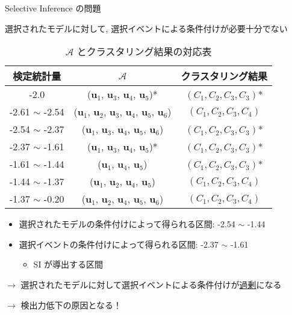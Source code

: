 \documentclass[dvipdfmx, 10pt]{beamer}
\newcommand{\ul}{\underline}
\newcommand{\zl}{\rightarrow}
\begin{document}
\begin{frame}{Selective Inference の問題}

    選択されたモデルに対して, 選択イベントによる条件付けが必要十分でない
    \begin{table}[htb]
        \centering
        \begin{tabular}{|c|c|c|} \hline
            検定統計量 & $\mathcal{A}$ & クラスタリング結果 \\\hline
            -2.0 & ($\bm{u}_1$, $\bm{u}_3$, $\bm{u}_4$, $\bm{u}_5$)* & $(C_1, C_2, C_3, C_3)$* \\\hline \hline
            -2.61 $\sim$ -2.54& ($\bm{u}_1$, $\bm{u}_2$, $\bm{u}_3$, $\bm{u}_4$, $\bm{u}_5$, $\bm{u}_6$) & $(C_1, C_2, C_3, C_4)$ \\\hline
            -2.54 $\sim$ -2.37& ($\bm{u}_1$, $\bm{u}_3$, $\bm{u}_4$, $\bm{u}_5$, $\bm{u}_6$) & $(C_1, C_2, C_3, C_3)$* \\\hline
            -2.37 $\sim$ -1.61& ($\bm{u}_1$, $\bm{u}_3$, $\bm{u}_4$, $\bm{u}_5$)* & $(C_1, C_2, C_3, C_3)$* \\\hline
            -1.61 $\sim$ -1.44& ($\bm{u}_1$, $\bm{u}_4$, $\bm{u}_5$) & $(C_1, C_2, C_3, C_3)$* \\\hline
            -1.44 $\sim$ -1.37& ($\bm{u}_1$, $\bm{u}_2$, $\bm{u}_4$, $\bm{u}_5$) & $(C_1, C_2, C_3, C_4)$ \\\hline
            -1.37 $\sim$ -0.20& ($\bm{u}_1$, $\bm{u}_2$, $\bm{u}_4$, $\bm{u}_5$, $\bm{u}_6$) & $(C_1, C_2, C_3, C_4)$ \\\hline
        \end{tabular}
        \caption{$\mathcal{A}$ とクラスタリング結果の対応表}
    \end{table}

    \begin{itemize}
        \item 選択されたモデルの条件付けによって得られる区間: -2.54 $\sim$ -1.44
        \item 選択イベントの条件付けによって得られる区間: -2.37 $\sim$ -1.61
        \begin{itemize}
            \item SI が導出する区間
        \end{itemize}
    \end{itemize}
    
    $\zl$ 選択されたモデルに対して選択イベントによる条件付けが\ul{過剰}になる

    $\zl$ \alert{検出力低下}の原因となる！

\end{frame}
\end{document}
